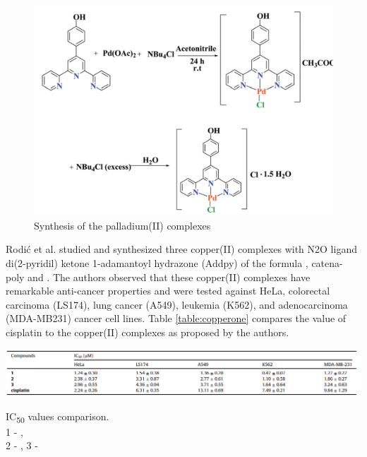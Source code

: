 \begin{figure}[!ht]
    \centering
    \includegraphics[scale = 0.75]{pdthree.png}
    \caption{Synthesis of the palladium(II) complexes}
    \label{fig:pdthree}
\end{figure}

\hspace{0.1cm}Rodi\'c et al. \cite{rodic2016synthesis} studied and synthesized three copper(II) complexes with N2O ligand di(2-pyridil) ketone 1-adamantoyl hydrazone (Addpy) of the formula , catena-poly and . The authors observed that these copper(II) complexes have remarkable anti-cancer properties and were tested against HeLa, colorectal carcinoma (LS174), lung cancer (A549), leukemia (K562), and adenocarcinoma (MDA-MB231) cancer cell lines. 
Table \ref{table:copperone} compares the value of cisplatin to the copper(II) complexes as proposed by the authors. 

\begin{table}[!ht]
    \centering
    \includegraphics[scale = 0.65]{copperone.png}
    \centering
    \caption{IC\textsubscript{50} values comparison.\\ 
    1 - , \\
    2 - , 3 - }
    \label{table:copperone}
\end{table}

